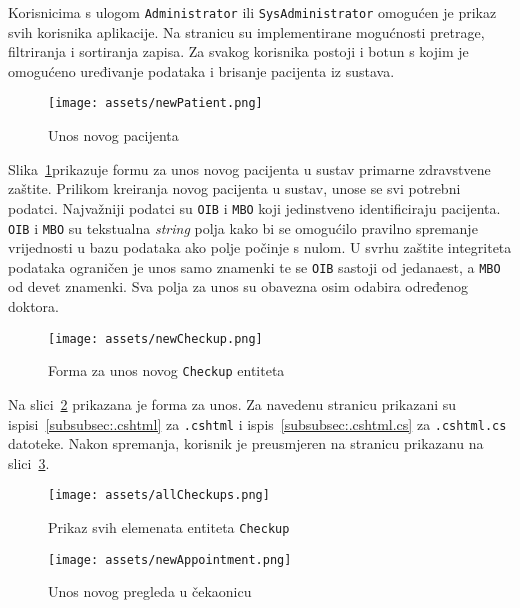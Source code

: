 Korisnicima s ulogom \texttt{Administrator} ili \texttt{SysAdministrator} omogućen je prikaz svih korisnika aplikacije. Na stranicu su implementirane mogućnosti pretrage, filtriranja i sortiranja zapisa. Za svakog korisnika postoji i botun s kojim je omogućeno uređivanje podataka i brisanje pacijenta iz sustava.

\begin{figure}[H]
	\texttt{[image: assets/newPatient.png]}
	\centering
	\caption{Unos novog pacijenta}
	\label{fig:newPatient}
\end{figure}

Slika~\ref{fig:newPatient}prikazuje formu za unos novog pacijenta u sustav primarne zdravstvene zaštite. Prilikom kreiranja novog pacijenta u sustav, unose se svi potrebni podatci. Najvažniji podatci su \texttt{OIB} i \texttt{MBO} koji jedinstveno identificiraju pacijenta. \texttt{OIB} i \texttt{MBO} su tekstualna \textit{string} polja kako bi se omogućilo pravilno spremanje vrijednosti u bazu podataka ako polje počinje s nulom. U svrhu zaštite integriteta podataka ograničen je unos samo znamenki te se \texttt{OIB} sastoji od jedanaest, a \texttt{MBO} od devet znamenki. Sva polja za unos su obavezna osim odabira određenog doktora. 

\begin{figure}[H]
	\texttt{[image: assets/newCheckup.png]}
	\centering
	\caption{Forma za unos novog \texttt{Checkup} entiteta}
	\label{fig:newCheckup}
\end{figure}

Na slici~\ref{fig:newCheckup} prikazana je forma za unos. Za navedenu stranicu prikazani su ispisi~\ref{subsubsec:.cshtml} za \texttt{.cshtml} i ispis~\ref{subsubsec:.cshtml.cs} za \texttt{.cshtml.cs} datoteke. Nakon spremanja, korisnik je preusmjeren na stranicu prikazanu na slici~\ref{fig:allCheckups}.

\begin{figure}[H]
	\texttt{[image: assets/allCheckups.png]}
	\centering
	\caption{Prikaz svih elemenata entiteta \texttt{Checkup}}
	\label{fig:allCheckups}
\end{figure}

\begin{figure}[H]
	\texttt{[image: assets/newAppointment.png]}
	\centering
	\caption{Unos novog pregleda u čekaonicu}
	\label{fig:newAppointment}
\end{figure}

